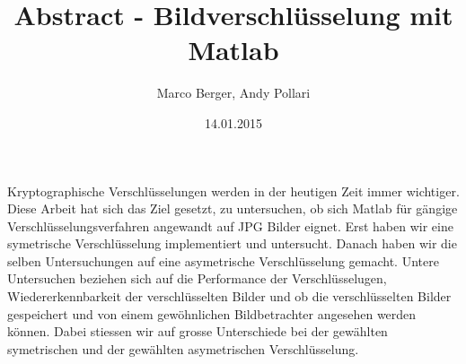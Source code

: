 \documentclass[paper=a4,fontsize=12pt]{scrartcl}
\begin{document}
\title{Abstract - Bildverschlüsselung mit Matlab}
\author{Marco Berger, Andy Pollari}
\date{14.01.2015}
\maketitle
Kryptographische Verschlüsselungen werden in der heutigen Zeit immer wichtiger.
Diese Arbeit hat sich das Ziel gesetzt, zu untersuchen, ob sich Matlab für gängige Verschlüsselungsverfahren 
angewandt auf JPG Bilder eignet.
Erst haben wir eine symetrische Verschlüsselung implementiert und untersucht. 
Danach haben wir die selben Untersuchungen auf eine asymetrische Verschlüsselung gemacht.
Untere Untersuchen beziehen sich auf die Performance der Verschlüsselugen, Wiedererkennbarkeit der verschlüsselten Bilder
und ob die verschlüsselten Bilder gespeichert und von einem gewöhnlichen Bildbetrachter angesehen werden können.
Dabei stiessen wir auf grosse Unterschiede bei der gewählten symetrischen und der gewählten asymetrischen Verschlüsselung.
\newpage
\end{document}
